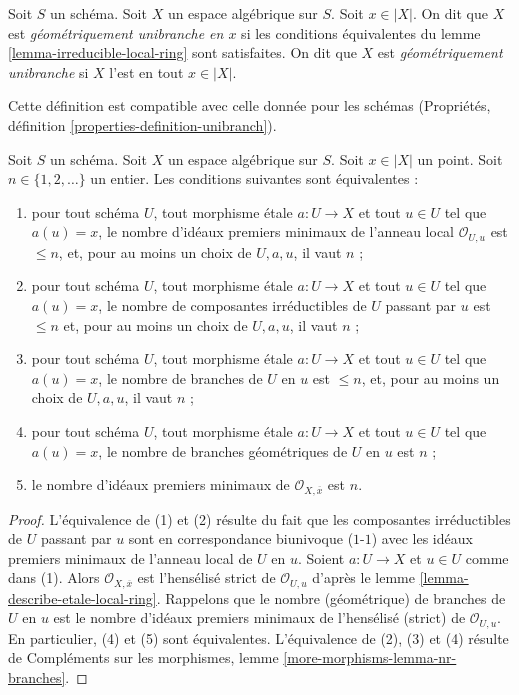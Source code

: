 \begin{definition}
\label{definition-unibranch}
Soit $S$ un schéma. Soit $X$ un espace algébrique sur $S$.
Soit $x \in |X|$. On dit que $X$ est {\it géométriquement unibranche
en $x$} si les conditions équivalentes du
lemme \ref{lemma-irreducible-local-ring}
sont satisfaites. On dit que $X$ est {\it géométriquement unibranche} si $X$ l'est
en tout $x \in |X|$.
\end{definition}

\noindent
Cette définition est compatible avec celle donnée pour les schémas
(Propriétés, définition \ref{properties-definition-unibranch}).

\begin{lemma}
\label{lemma-nr-branches-local-ring}
Soit $S$ un schéma. Soit $X$ un espace algébrique sur $S$.
Soit $x \in |X|$ un point. Soit $n \in \{1, 2, \ldots\}$ un entier.
Les conditions suivantes sont équivalentes :
\begin{enumerate}
\item pour tout schéma $U$, tout morphisme \'etale $a : U \to X$ et
tout $u \in U$ tel que $a(u) = x$, le nombre d'idéaux premiers minimaux
de l'anneau local $\mathcal{O}_{U, u}$ est $\leq n$,
et, pour au moins un choix de $U, a, u$, il vaut $n$ ;
\item pour tout schéma $U$, tout morphisme \'etale $a : U \to X$ et
tout $u \in U$ tel que $a(u) = x$, le nombre de composantes irréductibles de
$U$ passant par $u$ est $\leq n$ et, pour au moins un choix
de $U, a, u$, il vaut $n$ ;
\item pour tout schéma $U$, tout morphisme \'etale $a : U \to X$ et tout $u \in U$
tel que $a(u) = x$, le nombre de branches de $U$ en $u$ est $\leq n$,
et, pour au moins un choix de $U, a, u$, il vaut $n$ ;
\item pour tout schéma $U$, tout morphisme \'etale $a : U \to X$ et tout $u \in U$
tel que $a(u) = x$, le nombre de branches géométriques de $U$ en $u$ est $n$ ;
\item le nombre d'idéaux premiers minimaux de
$\mathcal{O}_{X, \overline{x}}$ est $n$.
\end{enumerate}
\end{lemma}

\begin{proof}
L'équivalence de (1) et (2) résulte du fait que les composantes
irréductibles de $U$ passant par $u$ sont en correspondance biunivoque ($1$-$1$) avec les
idéaux premiers minimaux de l'anneau local de $U$ en $u$. Soient $a : U \to X$ et
$u \in U$ comme dans (1). Alors $\mathcal{O}_{X, \overline{x}}$ est
l'hensélisé strict de $\mathcal{O}_{U, u}$ d'après le
lemme \ref{lemma-describe-etale-local-ring}. Rappelons que
le nombre (géométrique) de branches de $U$ en $u$ est le nombre
d'idéaux premiers minimaux de l'hensélisé (strict) de $\mathcal{O}_{U, u}$.
En particulier, (4) et (5) sont équivalentes.
L'équivalence de (2), (3) et (4) résulte de
Compléments sur les morphismes, lemme \ref{more-morphisms-lemma-nr-branches}.
\end{proof}

